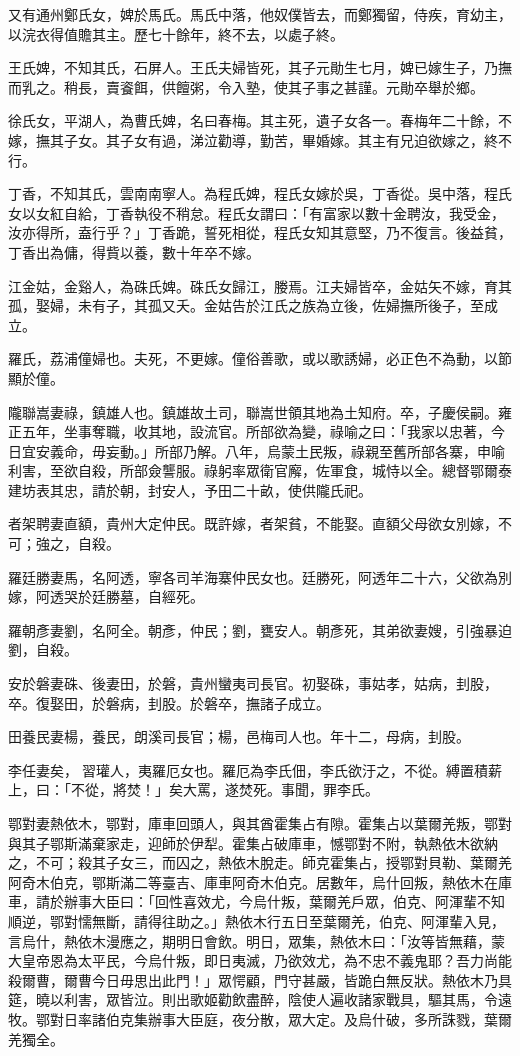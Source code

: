 \begin{pinyinscope}
又有通州鄭氏女，婢於馬氏。馬氏中落，他奴僕皆去，而鄭獨留，侍疾，育幼主，以浣衣得值贍其主。歷七十餘年，終不去，以處子終。

王氏婢，不知其氏，石屏人。王氏夫婦皆死，其子元勛生七月，婢已嫁生子，乃撫而乳之。稍長，賣餈餌，供饘粥，令入塾，使其子事之甚謹。元勛卒舉於鄉。

徐氏女，平湖人，為曹氏婢，名曰春梅。其主死，遺子女各一。春梅年二十餘，不嫁，撫其子女。其子女有過，涕泣勸導，勤苦，畢婚嫁。其主有兄迫欲嫁之，終不行。

丁香，不知其氏，雲南南寧人。為程氏婢，程氏女嫁於吳，丁香從。吳中落，程氏女以女紅自給，丁香執役不稍怠。程氏女謂曰：「有富家以數十金聘汝，我受金，汝亦得所，盍行乎？」丁香跪，誓死相從，程氏女知其意堅，乃不復言。後益貧，丁香出為傭，得貲以養，數十年卒不嫁。

江金姑，金谿人，為硃氏婢。硃氏女歸江，媵焉。江夫婦皆卒，金姑矢不嫁，育其孤，娶婦，未有子，其孤又夭。金姑告於江氏之族為立後，佐婦撫所後子，至成立。

羅氏，荔浦僮婦也。夫死，不更嫁。僮俗善歌，或以歌誘婦，必正色不為動，以節顯於僮。

隴聯嵩妻祿，鎮雄人也。鎮雄故土司，聯嵩世領其地為土知府。卒，子慶侯嗣。雍正五年，坐事奪職，收其地，設流官。所部欲為變，祿喻之曰：「我家以忠著，今日宜安義命，毋妄動。」所部乃解。八年，烏蒙土民叛，祿親至舊所部各寨，申喻利害，至欲自殺，所部僉讋服。祿躬率眾衛官廨，佐軍食，城恃以全。總督鄂爾泰建坊表其忠，請於朝，封安人，予田二十畝，使供隴氏祀。

者架聘妻直額，貴州大定仲民。既許嫁，者架貧，不能娶。直額父母欲女別嫁，不可；強之，自殺。

羅廷勝妻馬，名阿透，寧各司羊海寨仲民女也。廷勝死，阿透年二十六，父欲為別嫁，阿透哭於廷勝墓，自經死。

羅朝彥妻劉，名阿全。朝彥，仲民；劉，甕安人。朝彥死，其弟欲妻嫂，引強暴迫劉，自殺。

安於磐妻硃、後妻田，於磐，貴州蠻夷司長官。初娶硃，事姑孝，姑病，刲股，卒。復娶田，於磐病，刲股。於磐卒，撫諸子成立。

田養民妻楊，養民，朗溪司長官；楊，邑梅司人也。年十二，母病，刲股。

李任妻矣，習瓘人，夷羅厄女也。羅厄為李氏佃，李氏欲汙之，不從。縛置積薪上，曰：「不從，將焚！」矣大罵，遂焚死。事聞，罪李氏。

鄂對妻熱依木，鄂對，庫車回頭人，與其酋霍集占有隙。霍集占以葉爾羌叛，鄂對與其子鄂斯滿棄家走，迎師於伊犁。霍集占破庫車，憾鄂對不附，執熱依木欲納之，不可；殺其子女三，而囚之，熱依木脫走。師克霍集占，授鄂對貝勒、葉爾羌阿奇木伯克，鄂斯滿二等臺吉、庫車阿奇木伯克。居數年，烏什回叛，熱依木在庫車，請於辦事大臣曰：「回性喜效尤，今烏什叛，葉爾羌戶眾，伯克、阿渾輩不知順逆，鄂對懦無斷，請得往助之。」熱依木行五日至葉爾羌，伯克、阿渾輩入見，言烏什，熱依木漫應之，期明日會飲。明日，眾集，熱依木曰：「汝等皆無藉，蒙大皇帝恩為太平民，今烏什叛，即日夷滅，乃欲效尤，為不忠不義鬼耶？吾力尚能殺爾曹，爾曹今日毋思出此門！」眾愕顧，門守甚嚴，皆跪白無反狀。熱依木乃具筵，曉以利害，眾皆泣。則出歌姬勸飲盡醉，陰使人遍收諸家戰具，驅其馬，令遠牧。鄂對日率諸伯克集辦事大臣庭，夜分散，眾大定。及烏什破，多所誅戮，葉爾羌獨全。


\end{pinyinscope}
